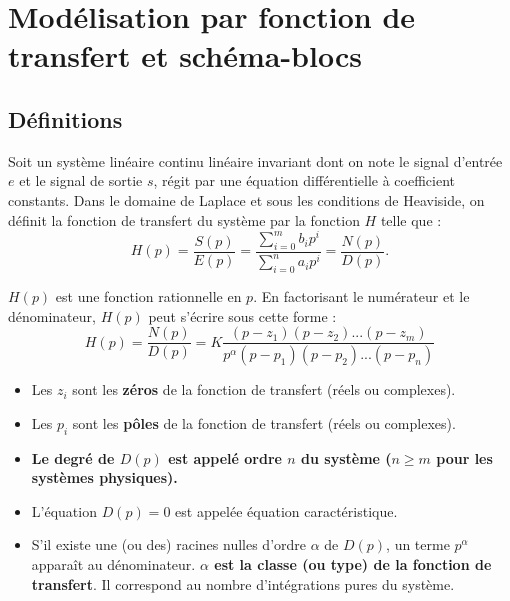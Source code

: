 \section{Modélisation par fonction de transfert et schéma-blocs}

\subsection{Définitions}

\begin{defi}
Soit un système linéaire continu linéaire invariant dont on note le signal d'entrée $e$ et le signal de sortie $s$, régit par une équation différentielle à coefficient constants. Dans le domaine de Laplace et sous les conditions de Heaviside, on définit la fonction de transfert du système par la fonction $H$ telle que : 
$$
H(p)
=\dfrac{S(p)}{E(p)} 
= \dfrac{\sum\limits_{i=0}^{m} b_i p^i}{\sum\limits_{i=0}^{n} a_i p^i}
=\dfrac{N(p)}{D(p)}.
$$
 \end{defi}







\begin{defi}
$H(p)$ est une fonction rationnelle en $p$. En factorisant le numérateur et le
dénominateur, $H(p)$ peut s'écrire sous cette forme :
$$
H(p) = \dfrac{N(p)}{D(p)} =
K \dfrac{\left(p-z_1 \right)\left(p-z_2 \right)...\left(p-z_m \right)}{
p^{\alpha} \left(p-p_1 \right)\left(p-p_2 \right)...\left(p-p_n \right)}
$$

 \begin{itemize}
 \item Les $z_i$ sont les \textbf{zéros} de la fonction de transfert (réels ou
complexes).
\item Les $p_i$ sont les \textbf{pôles} de la fonction de transfert (réels ou
complexes).
\item \textbf{Le degré de $D(p)$ est appelé ordre $n$ du système ($n\geq m$ pour les
systèmes physiques).}
\item L'équation $D(p)=0$ est appelée équation caractéristique.
\item S'il existe une (ou des) racines nulles d'ordre $\alpha$ de $D(p)$, un
terme $p^\alpha$ apparaît au dénominateur. \textbf{$\alpha$ est la classe (ou type) de
la fonction de transfert}. Il correspond au nombre d'intégrations pures du
système.
\end{itemize}
\end{defi}


